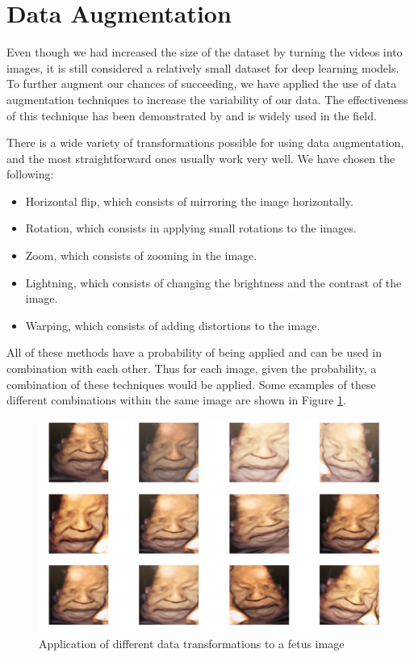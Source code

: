 \section{Data Augmentation}

Even though we had increased the size of the dataset by turning the videos into images, it is still considered a relatively small dataset for deep learning models. To further augment our chances of succeeding, we have applied the use of data augmentation techniques to increase the variability of our data. The effectiveness of this technique has been demonstrated by \cite{abs-1712-04621} and is widely used in the field.

There is a wide variety of transformations possible for using data augmentation, and the most straightforward ones usually work very well. We have chosen the following:

\begin{itemize}
    \item Horizontal flip, which consists of mirroring the image horizontally. 
    \item Rotation, which consists in applying small rotations to the images.
    \item Zoom, which consists of zooming in the image.
    \item Lightning, which consists of changing the brightness and the contrast of the image.
    \item Warping, which consists of adding distortions to the image. 
\end{itemize}

All of these methods have a probability of being applied and can be used in combination with each other. Thus for each image, given the probability, a combination of these techniques would be applied. Some examples of these different combinations within the same image are shown in Figure \ref{fig:data_augmentation}.

\begin{figure}[h!tp]
    \centering
    \includegraphics[width=.9\textwidth]{imgs/chap5_data_augmentation.png}
    \caption{Application of different data transformations to a fetus image}
    \label{fig:data_augmentation}
\end{figure}

